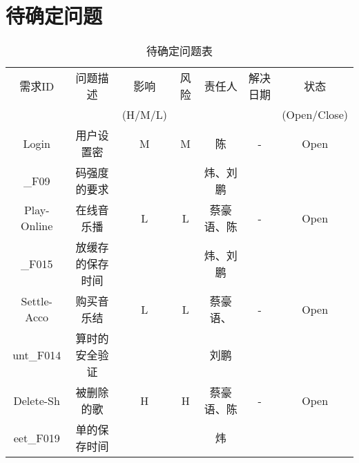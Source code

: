 \chapter{待确定问题}
\begin{table}[htbp]
\centering
\caption{待确定问题表} \label{tab:tbd_problems}
\begin{tabular}{|c|c|c|c|c|c|c|}
    \hline
    需求ID & 问题描述 & 影响 & 风险 & 责任人 & 解决日期 & 状态 \\
           &         &(H/M/L)&    &        &         &(Open/Close) \\
    \hline
    Login & 用户设置密 & M & M & 陈 & - & Open\\
    \_F09       &码强度的要求&  &   &炜、刘鹏   &   & \\
    \hline
    Play-Online& 在线音乐播 & L & L & 蔡豪语、陈 & - & Open\\
    \_F015                 &放缓存的保存时间&  &   &炜、刘鹏   &   & \\  
    \hline
    Settle-Acco & 购买音乐结 & L & L & 蔡豪语、 & - & Open\\
    unt\_F014                  &算时的安全验证&  &   &刘鹏   &   & \\ 
    \hline
    Delete-Sh & 被删除的歌 & H & H & 蔡豪语、陈 & - & Open\\
    eet\_F019                     &单的保存时间&  &   &炜   &   & \\ 
    \hline
\end{tabular}
\end{table}